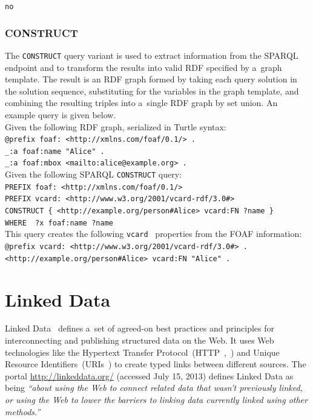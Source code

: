 \texttt{no}

\subsubsection{CONSTRUCT}

The \texttt{CONSTRUCT} query variant is used to extract
information from the SPARQL endpoint
and to transform the results into valid RDF
specified by a~graph template.
The result is an RDF graph formed by taking
each query solution in the solution sequence,
substituting for the variables in the graph template,
and combining the resulting triples into
a~single RDF graph by set union.
An example query is given below.\\

\noindent Given the following RDF graph,
serialized in Turtle syntax:\\

\texttt{@prefix foaf: <http://xmlns.com/foaf/0.1/> .}\\
\texttt{\indent \_:a foaf:name "Alice" .}\\
\texttt{\indent \_:a foaf:mbox <mailto:alice@example.org> .}\\

\noindent Given the following SPARQL \texttt{CONSTRUCT} query:\\

\texttt{PREFIX foaf: <http://xmlns.com/foaf/0.1/>}\\
\texttt{\indent PREFIX vcard: <http://www.w3.org/2001/vcard-rdf/3.0\#>}\\
\texttt{\indent CONSTRUCT \{ <http://example.org/person\#Alice> vcard:FN ?name \}}\\
\texttt{\indent WHERE { ?x foaf:name ?name }}\\

\noindent This query creates the following
\texttt{vcard}~\cite{dawson1998vcard}
properties from the FOAF information:\\

\texttt{@prefix vcard: <http://www.w3.org/2001/vcard-rdf/3.0\#> .}\\
\texttt{\indent <http://example.org/person\#Alice> vcard:FN "Alice" .}

\section{Linked Data}

Linked Data~\cite{bernerslee2006linkeddata}
defines a~set of agreed-on best practices and
principles for interconnecting and publishing
structured data on the Web.
It uses Web technologies like the Hypertext Transfer Protocol~(HTTP~,~\cite{fielding1999http})
and Unique Resource Identifiers~(URIs~\cite{bernerslee2005uri})
to create typed links between different sources.
The portal \url{http://linkeddata.org/} (accessed July 15, 2013)
defines Linked Data as being
\textit{``about using the Web to connect related data that
wasn’t previously linked, or using the Web
to lower the barriers to linking data
currently linked using other methods.''}

